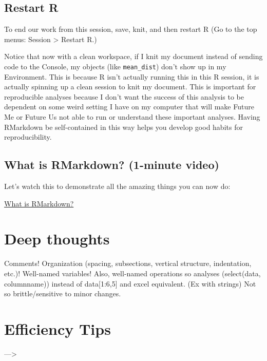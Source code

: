 \documentclass[]{book}
\begin{document}
\hypertarget{restart-r}{%
\subsection{Restart R}\label{restart-r}}

To end our work from this session, save, knit, and then restart R (Go to the top menus: Session \textgreater{} Restart R.)

Notice that now with a clean workspace, if I knit my document instead of sending code to the Console, my objects (like \texttt{mean\_dist}) don't show up in my Environment. This is because R isn't actually running this in this R session, it is actually spinning up a clean session to knit my document. This is important for reproducible analyses because I don't want the success of this analysis to be dependent on some weird setting I have on my computer that will make Future Me or Future Us not able to run or understand these important analyses. Having RMarkdown be self-contained in this way helps you develop good habits for reproducibility.

\hypertarget{what-is-rmarkdown-1-minute-video}{%
\subsection{What is RMarkdown? (1-minute video)}\label{what-is-rmarkdown-1-minute-video}}

Let's watch this to demonstrate all the amazing things you can now do:

\href{https://vimeo.com/178485416}{What is RMarkdown?}

\hypertarget{deep-thoughts}{%
\section{Deep thoughts}\label{deep-thoughts}}

Comments! Organization (spacing, subsections, vertical structure, indentation, etc.)! Well-named variables! Also, well-named operations so analyses (select(data, columnname)) instead of data{[}1:6,5{]} and excel equivalent. (Ex with strings)
Not so brittle/sensitive to minor changes.

\hypertarget{efficiency-tips}{%
\section{Efficiency Tips}\label{efficiency-tips}}

---\textgreater{}
\end{document}
